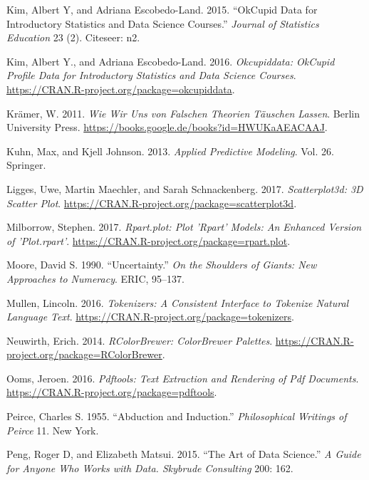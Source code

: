 \documentclass[12pt,]{book}
\begin{document}
\hypertarget{ref-kim2015okcupid}{}
Kim, Albert Y, and Adriana Escobedo-Land. 2015. ``OkCupid Data for
Introductory Statistics and Data Science Courses.'' \emph{Journal of
Statistics Education} 23 (2). Citeseer: n2.

\hypertarget{ref-R-okcupiddata}{}
Kim, Albert Y., and Adriana Escobedo-Land. 2016. \emph{Okcupiddata:
OkCupid Profile Data for Introductory Statistics and Data Science
Courses}. \url{https://CRAN.R-project.org/package=okcupiddata}.

\hypertarget{ref-kraemer2011wir}{}
Krämer, W. 2011. \emph{Wie Wir Uns von Falschen Theorien Täuschen
Lassen}. Berlin University Press.
\url{https://books.google.de/books?id=HWUKaAEACAAJ}.

\hypertarget{ref-kuhn2013applied}{}
Kuhn, Max, and Kjell Johnson. 2013. \emph{Applied Predictive Modeling}.
Vol. 26. Springer.

\hypertarget{ref-R-scatterplot3d}{}
Ligges, Uwe, Martin Maechler, and Sarah Schnackenberg. 2017.
\emph{Scatterplot3d: 3D Scatter Plot}.
\url{https://CRAN.R-project.org/package=scatterplot3d}.

\hypertarget{ref-R-rpart.plot}{}
Milborrow, Stephen. 2017. \emph{Rpart.plot: Plot 'Rpart' Models: An
Enhanced Version of 'Plot.rpart'}.
\url{https://CRAN.R-project.org/package=rpart.plot}.

\hypertarget{ref-moore1990uncertainty}{}
Moore, David S. 1990. ``Uncertainty.'' \emph{On the Shoulders of Giants:
New Approaches to Numeracy}. ERIC, 95--137.

\hypertarget{ref-R-tokenizers}{}
Mullen, Lincoln. 2016. \emph{Tokenizers: A Consistent Interface to
Tokenize Natural Language Text}.
\url{https://CRAN.R-project.org/package=tokenizers}.

\hypertarget{ref-R-RColorBrewer}{}
Neuwirth, Erich. 2014. \emph{RColorBrewer: ColorBrewer Palettes}.
\url{https://CRAN.R-project.org/package=RColorBrewer}.

\hypertarget{ref-R-pdftools}{}
Ooms, Jeroen. 2016. \emph{Pdftools: Text Extraction and Rendering of Pdf
Documents}. \url{https://CRAN.R-project.org/package=pdftools}.

\hypertarget{ref-peirce1955abduction}{}
Peirce, Charles S. 1955. ``Abduction and Induction.''
\emph{Philosophical Writings of Peirce} 11. New York.

\hypertarget{ref-peng2015art}{}
Peng, Roger D, and Elizabeth Matsui. 2015. ``The Art of Data Science.''
\emph{A Guide for Anyone Who Works with Data. Skybrude Consulting} 200:
162.
\end{document}
